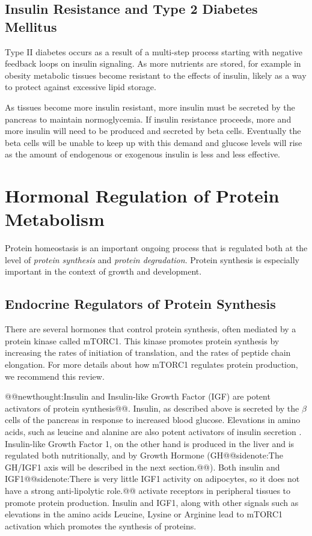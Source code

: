 \documentclass{tufte-handout}
\makeatletter
\def\newthought#1{@@newthought:#1@@}
\def\sidenote#1{@@sidenote:#1@@}
\makeatother
\begin{document}
\subsection{Insulin Resistance and Type 2 Diabetes Mellitus}

Type II diabetes occurs as a result of a multi-step process starting with negative feedback loops on insulin signaling.  As more nutrients are stored, for example in obesity metabolic tissues become resistant to the effects of insulin, likely as a way to protect against excessive lipid storage.  

As tissues become more insulin resistant, more insulin must be secreted by the pancreas to maintain normoglycemia.  If insulin resistance proceeds, more and more insulin will need to be produced and secreted by beta cells.  Eventually the beta cells will be unable to keep up with this demand and glucose levels will rise as the amount of endogenous or exogenous insulin is less and less effective.

\section{Hormonal Regulation of Protein Metabolism}
Protein homeostasis is an important ongoing process that is regulated both at the level of \emph{protein synthesis} and \emph{protein degradation}.  Protein synthesis is especially important in the context of growth and development.  

\subsection{Endocrine Regulators of Protein Synthesis}

There are several hormones that control protein synthesis, often mediated by a protein kinase called mTORC1.   This kinase promotes protein synthesis by increasing the rates of initiation of translation, and the rates of peptide chain elongation.  For more details about how mTORC1 regulates protein production, we recommend this review\citep{Gingras2004}.

\newthought{Insulin and Insulin-like Growth Factor (IGF) are potent activators of protein synthesis}.  Insulin, as described above is secreted by the $\beta$ cells of the pancreas in response to increased blood glucose.  Elevations in amino acids, such as leucine and alanine are also potent activators of insulin secretion \citep{Floyd1966}.  Insulin-like Growth Factor 1, on the other hand is produced in the liver and is regulated both nutritionally, and by Growth Hormone (GH\sidenote{The GH/IGF1 axis will be described in the next section.}).  Both insulin and IGF1\sidenote{There is very little IGF1 activity on adipocytes, so it does not have a strong anti-lipolytic role.} activate receptors in peripheral tissues to promote protein production.   Insulin and IGF1, along with other signals such as elevations in the amino acids Leucine, Lysine or Arginine lead to mTORC1 activation which promotes the synthesis of proteins.
\end{document}
